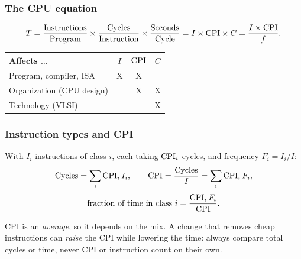 \subsubsection{The CPU equation}
\begin{theorem}
\[
  T=\frac{\text{Instructions}}{\text{Program}}\times
    \frac{\text{Cycles}}{\text{Instruction}}\times
    \frac{\text{Seconds}}{\text{Cycle}}
   =I\times\mathrm{CPI}\times C=\frac{I\times\mathrm{CPI}}{f}.
\]
\end{theorem}
\begin{center}
\begin{tabular}{@{}lccc@{}}
\toprule
Affects $\dots$ & $I$ & $\mathrm{CPI}$ & $C$ \\
\midrule
Program, compiler, ISA & X & X & \\
Organization (CPU design) & & X & X \\
Technology (VLSI) & & & X \\
\bottomrule
\end{tabular}
\end{center}

\subsubsection{Instruction types and CPI}
\begin{prop}
With $I_i$ instructions of class $i$, each taking $\mathrm{CPI}_i$ cycles, and
frequency $F_i=I_i/I$:
\[
  \text{Cycles}=\sum_i \mathrm{CPI}_i\,I_i,\qquad
  \mathrm{CPI}=\frac{\text{Cycles}}{I}=\sum_i \mathrm{CPI}_i\,F_i,
\]
\[
  \text{fraction of time in class } i=\frac{\mathrm{CPI}_i\,F_i}{\mathrm{CPI}}.
\]
\end{prop}
\begin{remark}
CPI is an \emph{average}, so it depends on the mix. A change that removes cheap
instructions can \emph{raise} the CPI while lowering the time: always compare
total cycles or time, never CPI or instruction count on their own.
\end{remark}

